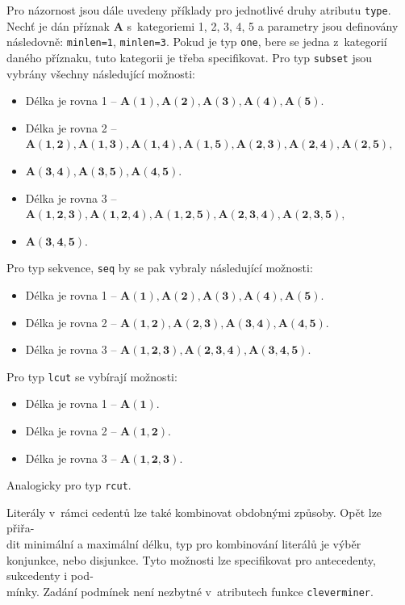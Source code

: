 Pro názornost jsou dále uvedeny příklady pro jednotlivé druhy atributu \texttt{type}. Nechť je dán příznak $\mathbf{A}$ s~kategoriemi 1, 2, 3, 4, 5 a parametry jsou definovány následovně: \texttt{minlen=1}, \texttt{minlen=3}. Pokud je typ \texttt{one}, bere se jedna z~kategorií daného příznaku, tuto kategorii je třeba specifikovat. Pro typ \texttt{subset} jsou vybrány všechny následující možnosti:
\begin{itemize}
    \itemsep0em
    \item Délka je rovna 1 --  $\mathbf{A(1), A(2), A(3), A(4), A(5)}.$
    \item Délka je rovna 2 --  $\mathbf{A(1, 2), A(1, 3), A(1, 4), A(1, 5), A(2, 3), A(2, 4), A(2, 5)},$
    \item[] $\mathbf{A(3, 4), A(3, 5), A(4, 5)}.$
    \item Délka je rovna 3 --  $\mathbf{A(1, 2, 3), A(1, 2, 4), A(1, 2, 5),A(2, 3, 4), A(2, 3, 5),}$
    \item[] $\mathbf{A(3, 4, 5)}$.\cite{bib:GUHA}
\end{itemize}
Pro typ sekvence, \texttt{seq} by se pak vybraly následující možnosti:
\begin{itemize}
    \itemsep0em
    \item Délka je rovna 1 --  $\mathbf{A(1), A(2), A(3), A(4), A(5)}.$
    \item Délka je rovna 2 --  $\mathbf{A(1, 2), A(2, 3), A(3, 4), A(4, 5)}.$
    \item Délka je rovna 3 --  $\mathbf{A(1, 2, 3), A(2, 3, 4), A(3, 4, 5)}$.\cite{bib:GUHA}
\end{itemize}

Pro typ \texttt{lcut} se vybírají možnosti:
\begin{itemize}
    \itemsep0em
    \item Délka je rovna 1 --  $\mathbf{A(1)}.$
    \item Délka je rovna 2 --  $\mathbf{A(1, 2)}.$
    \item Délka je rovna 3 --  $\mathbf{A(1, 2, 3)}$.\cite{bib:GUHA}
\end{itemize}
Analogicky pro typ \texttt{rcut}.

Literály v~rámci cedentů lze také kombinovat obdobnými způsoby. Opět lze přiřa-\\dit minimální a maximální délku, typ pro kombinování literálů je výběr konjunkce, nebo disjunkce. Tyto možnosti lze specifikovat pro antecedenty, sukcedenty i pod-\\mínky. Zadání podmínek není nezbytné v~atributech funkce \texttt{cleverminer}.

